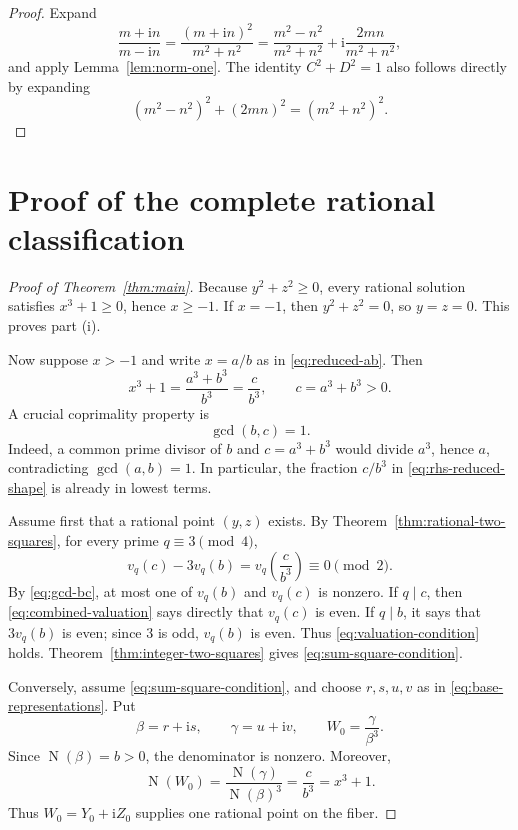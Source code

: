 \documentclass[11pt,a4paper]{article}
\numberwithin{equation}{section}
\theoremstyle{definition}
\newcommand{\N}{\operatorname{N}}
\newcommand{\ii}{\mathrm{i}}
\begin{document}
\begin{proof}
Expand
\[
 \frac{m+\ii n}{m-\ii n}
 =\frac{(m+\ii n)^2}{m^2+n^2}
 =\frac{m^2-n^2}{m^2+n^2}
 +\ii\frac{2mn}{m^2+n^2},
\]
and apply Lemma~\ref{lem:norm-one}. The identity $C^2+D^2=1$ also follows directly by expanding
\[
 (m^2-n^2)^2+(2mn)^2=(m^2+n^2)^2.
\]
\end{proof}

\section{Proof of the complete rational classification}

\begin{proof}[Proof of Theorem~\ref{thm:main}]
Because $y^2+z^2\ge0$, every rational solution satisfies $x^3+1\ge0$, hence $x\ge-1$. If $x=-1$, then $y^2+z^2=0$, so $y=z=0$. This proves part (i).

Now suppose $x>-1$ and write $x=a/b$ as in \eqref{eq:reduced-ab}. Then
\begin{equation}
 x^3+1=\frac{a^3+b^3}{b^3}=\frac{c}{b^3},
 \qquad c=a^3+b^3>0.
 \label{eq:rhs-reduced-shape}
\end{equation}
A crucial coprimality property is
\begin{equation}
 \gcd(b,c)=1.
 \label{eq:gcd-bc}
\end{equation}
Indeed, a common prime divisor of $b$ and $c=a^3+b^3$ would divide $a^3$, hence $a$, contradicting $\gcd(a,b)=1$. In particular, the fraction $c/b^3$ in \eqref{eq:rhs-reduced-shape} is already in lowest terms.

Assume first that a rational point $(y,z)$ exists. By Theorem~\ref{thm:rational-two-squares}, for every prime $q\equiv3\pmod4$,
\begin{equation}
 v_q(c)-3v_q(b)
 =v_q\!\left(\frac{c}{b^3}\right)
 \equiv0\pmod2.
 \label{eq:combined-valuation}
\end{equation}
By \eqref{eq:gcd-bc}, at most one of $v_q(b)$ and $v_q(c)$ is nonzero. If $q\mid c$, then \eqref{eq:combined-valuation} says directly that $v_q(c)$ is even. If $q\mid b$, it says that $3v_q(b)$ is even; since $3$ is odd, $v_q(b)$ is even. Thus \eqref{eq:valuation-condition} holds. Theorem~\ref{thm:integer-two-squares} gives \eqref{eq:sum-square-condition}.

Conversely, assume \eqref{eq:sum-square-condition}, and choose $r,s,u,v$ as in \eqref{eq:base-representations}. Put
\[
 \beta=r+\ii s,
 \qquad
 \gamma=u+\ii v,
 \qquad
 W_0=\frac{\gamma}{\beta^3}.
\]
Since $\N(\beta)=b>0$, the denominator is nonzero. Moreover,
\begin{equation}
 \N(W_0)
 =\frac{\N(\gamma)}{\N(\beta)^3}
 =\frac{c}{b^3}
 =x^3+1.
 \label{eq:base-point-norm}
\end{equation}
Thus $W_0=Y_0+\ii Z_0$ supplies one rational point on the fiber.


\end{proof}
\end{document}
